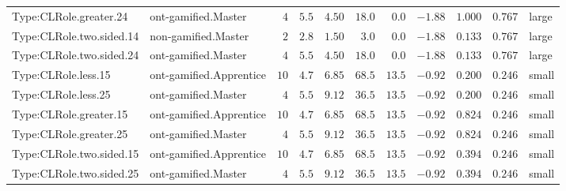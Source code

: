 \documentclass[6pt,a4paper]{article}
\begin{document}
{\begin{longtable}{llrrrrrrrrl}
Type:CLRole.greater.24&ont-gamified.Master&$ 4$&$5.5$&$ 4.50$&$ 18.0$&$ 0.0$&$-1.88$&$1.000$&$0.767$&large\tabularnewline
Type:CLRole.two.sided.14&non-gamified.Master&$ 2$&$2.8$&$ 1.50$&$  3.0$&$ 0.0$&$-1.88$&$0.133$&$0.767$&large\tabularnewline
Type:CLRole.two.sided.24&ont-gamified.Master&$ 4$&$5.5$&$ 4.50$&$ 18.0$&$ 0.0$&$-1.88$&$0.133$&$0.767$&large\tabularnewline
Type:CLRole.less.15&ont-gamified.Apprentice&$10$&$4.7$&$ 6.85$&$ 68.5$&$13.5$&$-0.92$&$0.200$&$0.246$&small\tabularnewline
Type:CLRole.less.25&ont-gamified.Master&$ 4$&$5.5$&$ 9.12$&$ 36.5$&$13.5$&$-0.92$&$0.200$&$0.246$&small\tabularnewline
Type:CLRole.greater.15&ont-gamified.Apprentice&$10$&$4.7$&$ 6.85$&$ 68.5$&$13.5$&$-0.92$&$0.824$&$0.246$&small\tabularnewline
Type:CLRole.greater.25&ont-gamified.Master&$ 4$&$5.5$&$ 9.12$&$ 36.5$&$13.5$&$-0.92$&$0.824$&$0.246$&small\tabularnewline
\newpage
Type:CLRole.two.sided.15&ont-gamified.Apprentice&$10$&$4.7$&$ 6.85$&$ 68.5$&$13.5$&$-0.92$&$0.394$&$0.246$&small\tabularnewline
Type:CLRole.two.sided.25&ont-gamified.Master&$ 4$&$5.5$&$ 9.12$&$ 36.5$&$13.5$&$-0.92$&$0.394$&$0.246$&small\tabularnewline
\hline
\end{longtable}}
\end{document}
